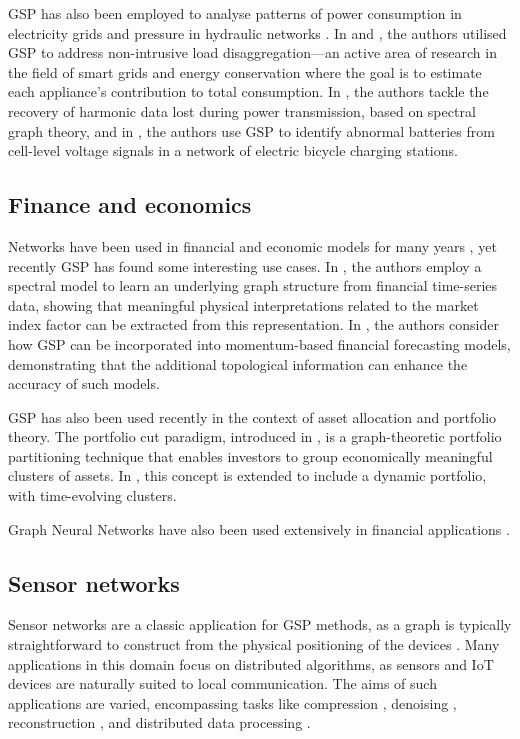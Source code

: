 GSP has also been employed to analyse patterns of power consumption in electricity grids \citep{Ramakrishna2021} and pressure in hydraulic networks \citep{Zhou2022}. In \cite{He2018} and \cite{Zheng2022}, the authors utilised GSP to address non-intrusive load disaggregation—an active area of research in the field of smart grids and energy conservation where the goal is to estimate each appliance's contribution to total consumption. In \cite{Ying2022}, the authors tackle the recovery of harmonic data lost during power transmission, based on spectral graph theory, and in \cite{Wang2022b}, the authors use GSP to identify abnormal batteries from cell-level voltage signals in a network of electric bicycle charging stations.


\subsection{Finance and economics}

Networks have been used in financial and economic models for many years \citep{Marti2021}, yet recently GSP has found some interesting use cases. In \cite{Vinicius2020}, the authors employ a spectral model to learn an underlying graph structure from financial time-series data, showing that meaningful physical interpretations related to the market index factor can be extracted from this representation. In \citep{Zhang2023}, the authors consider how GSP can be incorporated into momentum-based financial forecasting models, demonstrating that the additional topological information can enhance the accuracy of such models.

GSP has also been used recently in the context of asset allocation and portfolio theory. The portfolio cut paradigm, introduced in \citep{Dees2020}, is a graph-theoretic portfolio partitioning technique that enables investors to group economically meaningful clusters of assets. In \citep{Arroyo2022}, this concept is extended to include a dynamic portfolio, with time-evolving clusters.

Graph Neural Networks have also been used extensively in financial applications \citep{Wang2022c}. 


\subsection{Sensor networks}

Sensor networks are a classic application for GSP methods, as a graph is typically straightforward to construct from the physical positioning of the devices \citep{Jablonski2017}. Many applications in this domain focus on distributed algorithms, as sensors and IoT devices are naturally suited to local communication. The aims of such applications are varied, encompassing tasks like compression \citep{Zhu2012}, denoising \citep{Tay2021}, reconstruction \citep{Wang2015}, and distributed data processing \citep{Chi2022}.


